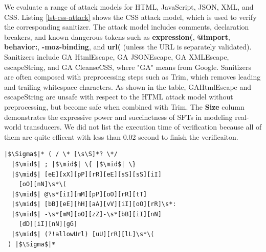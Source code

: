 We evaluate a range of attack models for HTML, JavaScript, JSON, XML, and CSS. Listing \ref{lst-css-attack} shows the CSS attack model, which is used to verify the corresponding sanitizer. The attack model includes comments, declaration breakers, and known dangerous tokens such as \textbf{expression(}, \textbf{@import}, \textbf{behavior:}, \textbf{-moz-binding}, and \textbf{url(} (unless the URL is separately validated). Sanitizers include GA HtmlEscape, GA JSONEscape, GA XMLEscape, escapeString, and GA CleanseCSS, where "GA" means from Google. Sanitizers are often composed with preprocessing steps such as Trim, which removes leading and trailing whitespace characters. As shown in the table, GAHtmlEscape and escapeString are unsafe with respect to the HTML attack model without preprocessing, but become safe when combined with Trim. The \textbf{Size} column demonstrates the expressive power and succinctness of SFTs in modeling real-world transducers. We did not list the execution time of verification because all of them are quite efficent with less than 0.02 second to finish the verificaiton.




\begin{lstlisting}[language={}, caption={CSS attack model for sanitizer verification.}, label={lst-css-attack}, float=htbp]
|$\Sigma$|* ( / \* [\s\S]*? \*/
  |$\mid$| ; |$\mid$| \{ |$\mid$| \}
  |$\mid$| [eE][xX][pP][rR][eE][sS][sS][iI]
    [oO][nN]\s*\(
  |$\mid$| @\s*[iI][mM][pP][oO][rR][tT]
  |$\mid$| [bB][eE][hH][aA][vV][iI][oO][rR]\s*:
  |$\mid$| -\s*[mM][oO][zZ]-\s*[bB][iI][nN]
    [dD][iI][nN][gG]
  |$\mid$| (?!allowUrl) [uU][rR][lL]\s*\(
 ) |$\Sigma$|*
\end{lstlisting}



